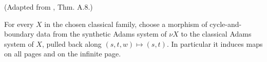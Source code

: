 \begin{definition}
\label{frontier:Literature:a1cdf0a80ba8}
(Adapted from \cite{BHS}, Thm. A.8.)\par{}

For every $X$ in the chosen classical family, choose a morphism of cycle-and-boundary data from the synthetic Adams system of $\nu X$ to the classical Adams system of $X$, pulled back along $(s,t,w)\mapsto(s,t)$. In particular it induces maps on all pages and on the infinite page.
\end{definition}

